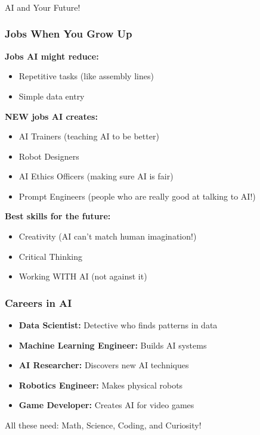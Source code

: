 \begin{frame}[fragile]\frametitle{}
\begin{center}
{\Large AI and Your Future!}
\end{center}
\end{frame}

\begin{frame}[fragile]\frametitle{Jobs When You Grow Up}

{\bf Jobs AI might reduce:}
\begin{itemize}
\item Repetitive tasks (like assembly lines)
\item Simple data entry
\end{itemize}

{\bf NEW jobs AI creates:}
\begin{itemize}
\item AI Trainers (teaching AI to be better)
\item Robot Designers
\item AI Ethics Officers (making sure AI is fair)
\item Prompt Engineers (people who are really good at talking to AI!)
\end{itemize}

{\bf Best skills for the future:}
\begin{itemize}
\item Creativity (AI can't match human imagination!)
\item Critical Thinking
\item Working WITH AI (not against it)
\end{itemize}
\end{frame}

\begin{frame}[fragile]\frametitle{Careers in AI}
\begin{itemize}
\item {\bf Data Scientist:} Detective who finds patterns in data
\item {\bf Machine Learning Engineer:} Builds AI systems
\item {\bf AI Researcher:} Discovers new AI techniques
\item {\bf Robotics Engineer:} Makes physical robots
\item {\bf Game Developer:} Creates AI for video games
\end{itemize}

\vspace{0.5cm}
All these need: Math, Science, Coding, and Curiosity!
\end{frame}

